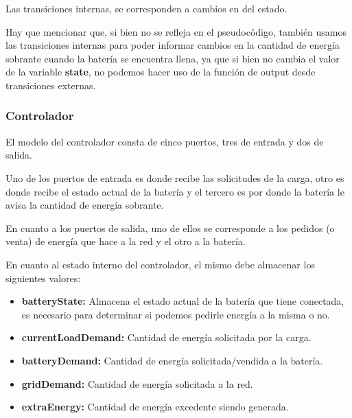 Las transiciones internas, se corresponden a cambios en del estado.



Hay que mencionar que, si bien no se refleja en el pseudocódigo, también usamos las
transiciones internas para poder informar cambios en la cantidad de energía sobrante cuando
la batería se encuentra llena, ya que si bien no cambia el valor de la variable \textbf{state},
no podemos hacer uso de la función de output desde transiciones externas.

\subsubsection{Controlador}

El modelo del controlador consta de cinco puertos, tres de entrada y dos de salida.

Uno de los puertos de entrada es donde recibe las solicitudes de la carga, otro
es donde recibe el estado actual de la batería y el tercero es por donde la batería 
le avisa la cantidad de energía sobrante.

En cuanto a los puertos de salida, uno de ellos se corresponde a los pedidos (o venta) de 
energía que hace a la red y el otro a la batería.

En cuanto al estado interno del controlador, el mismo debe almacenar los siguientes valores:

\begin{itemize}
    \item \textbf{batteryState:} Almacena el estado actual de la batería que tiene conectada,
    es necesario para determinar si podemos pedirle energía a la misma o no.
    \item \textbf{currentLoadDemand:} Cantidad de energía solicitada por la carga.
    \item \textbf{batteryDemand:} Cantidad de energía solicitada/vendida a la batería.
    \item \textbf{gridDemand:} Cantidad de energía solicitada a la red.
    \item \textbf{extraEnergy:} Cantidad de energía excedente siendo generada. 
\end{itemize}

